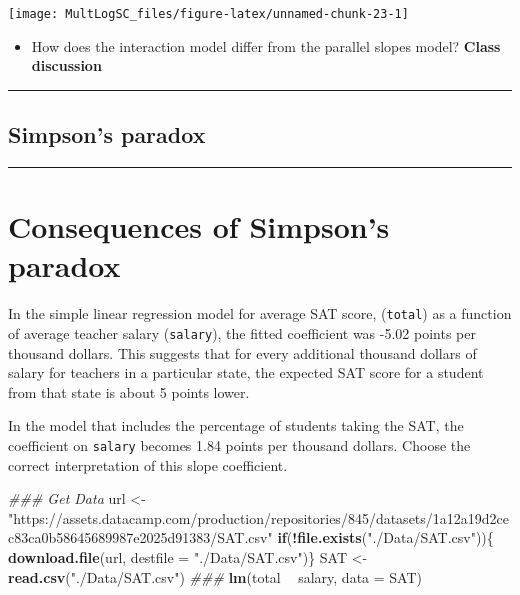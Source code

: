 \documentclass[
]{book}
\newenvironment{Shaded}{\begin{snugshade}}{\end{snugshade}}
\newcommand{\CommentTok}[1]{\textcolor[rgb]{0.56,0.35,0.01}{\textit{#1}}}
\newcommand{\ControlFlowTok}[1]{\textcolor[rgb]{0.13,0.29,0.53}{\textbf{#1}}}
\newcommand{\DataTypeTok}[1]{\textcolor[rgb]{0.13,0.29,0.53}{#1}}
\newcommand{\KeywordTok}[1]{\textcolor[rgb]{0.13,0.29,0.53}{\textbf{#1}}}
\newcommand{\NormalTok}[1]{#1}
\newcommand{\OperatorTok}[1]{\textcolor[rgb]{0.81,0.36,0.00}{\textbf{#1}}}
\newcommand{\StringTok}[1]{\textcolor[rgb]{0.31,0.60,0.02}{#1}}
\providecommand{\tightlist}{%
  \setlength{\itemsep}{0pt}\setlength{\parskip}{0pt}}
\begin{document}
\begin{center}\texttt{[image: MultLogSC\_files/figure-latex/unnamed-chunk-23-1]} \end{center}

\begin{itemize}
\tightlist
\item
  How does the interaction model differ from the parallel slopes model? \textbf{Class discussion}
\end{itemize}

\begin{center}\rule{0.5\linewidth}{0.5pt}\end{center}

\hypertarget{simpsons-paradox}{%
\subsection*{Simpson's paradox}\label{simpsons-paradox}}

\begin{center}\rule{0.5\linewidth}{0.5pt}\end{center}

\hypertarget{consequences-of-simpsons-paradox}{%
\section{Consequences of Simpson's paradox}\label{consequences-of-simpsons-paradox}}

In the simple linear regression model for average SAT score, (\texttt{total}) as a function of average teacher salary (\texttt{salary}), the fitted coefficient was -5.02 points per thousand dollars. This suggests that for every additional thousand dollars of salary for teachers in a particular state, the expected SAT score for a student from that state is about 5 points lower.

In the model that includes the percentage of students taking the SAT, the coefficient on \texttt{salary} becomes 1.84 points per thousand dollars. Choose the correct interpretation of this slope coefficient.

\begin{Shaded}
\begin{Highlighting}[]
\CommentTok{### Get Data}
\NormalTok{url <-}\StringTok{ "https://assets.datacamp.com/production/repositories/845/datasets/1a12a19d2cec83ca0b58645689987e2025d91383/SAT.csv"}
\ControlFlowTok{if}\NormalTok{(}\OperatorTok{!}\KeywordTok{file.exists}\NormalTok{(}\StringTok{"./Data/SAT.csv"}\NormalTok{))\{}
    \KeywordTok{download.file}\NormalTok{(url, }\DataTypeTok{destfile =} \StringTok{"./Data/SAT.csv"}\NormalTok{)\}}
\NormalTok{SAT <-}\StringTok{ }\KeywordTok{read.csv}\NormalTok{(}\StringTok{"./Data/SAT.csv"}\NormalTok{)}
\CommentTok{###}
\KeywordTok{lm}\NormalTok{(total }\OperatorTok{~}\StringTok{ }\NormalTok{salary, }\DataTypeTok{data =}\NormalTok{ SAT)}
\end{Highlighting}
\end{Shaded}
\end{document}
